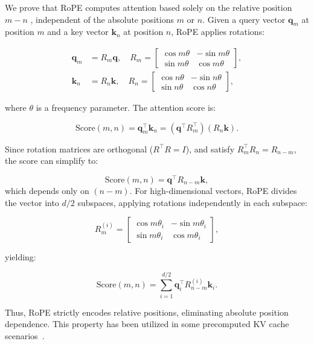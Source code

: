We prove that RoPE computes attention based solely on the relative position \( m-n \) , independent of the absolute positions \( m \) or \( n \). Given a query vector \( \boldsymbol{q}_m \) at position \( m \) and a key vector \( \boldsymbol{k}_n \) at position \( n \), RoPE applies rotations:

\begin{equation}
\begin{aligned}
\boldsymbol{q}_m & = R_m \boldsymbol{q}, \quad R_m = \begin{bmatrix}
\cos m\theta & -\sin m\theta \\
\sin m\theta & \cos m\theta
\end{bmatrix}, \\
\boldsymbol{k}_n & = R_n \boldsymbol{k}, \quad R_n = \begin{bmatrix}
\cos n\theta & -\sin n\theta \\
\sin n\theta & \cos n\theta
\end{bmatrix},
\end{aligned}
\end{equation}

where \( \theta \) is a frequency parameter. The attention score is:

\begin{equation}
\text{Score}(m, n) = \boldsymbol{q}_m^\top \boldsymbol{k}_n = (\boldsymbol{q}^\top R_m^\top)(R_n \boldsymbol{k}).
\end{equation}

Since rotation matrices are orthogonal (\( R^\top R = I \)), and satisfy \( R_m^\top R_n = R_{n - m} \), the score can simplify to:

\begin{equation}
\text{Score}(m, n) = \boldsymbol{q}^\top R_{n - m} \boldsymbol{k},
\end{equation}
which depends only on \( (n - m) \). For high-dimensional vectors, RoPE divides the vector into \( d/2 \) subspaces, applying rotations independently in each subspace:

\begin{equation}
R_{m}^{(i)} = \begin{bmatrix}
\cos m\theta_i & -\sin m\theta_i \\
\sin m\theta_i & \cos m\theta_i
\end{bmatrix},
\end{equation}

yielding:

\begin{equation}
\text{Score}(m, n) = \sum_{i=1}^{d/2} \boldsymbol{q}_i^\top R_{n - m}^{(i)} \boldsymbol{k}_i.
\end{equation}

Thus, RoPE strictly encodes relative positions, eliminating absolute position dependence. This property 
has been utilized in some precomputed KV cache scenarios~\cite{lu2024turborag}.
